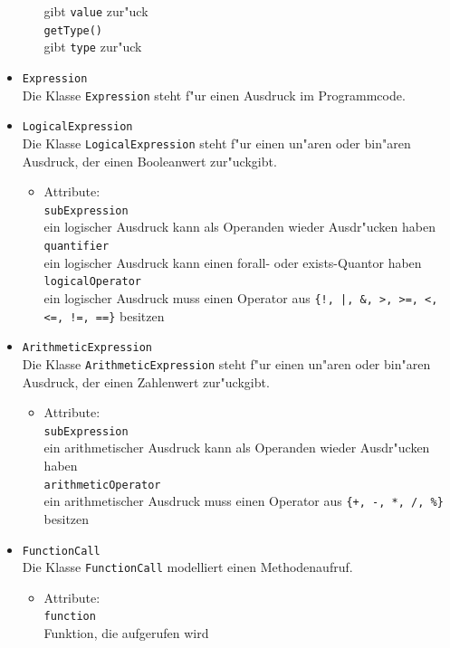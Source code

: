 \documentclass[10pt,a4paper,titlepage]{article}
\begin{document}
\begin{itemize}
\begin{itemize}
gibt \texttt{value} zur"uck \\
\texttt{getType()} \\
gibt \texttt{type} zur"uck
\end{itemize}
\item \texttt{Expression} \\
Die Klasse \texttt{Expression} steht f"ur einen Ausdruck im Programmcode. 
\item \texttt{LogicalExpression} \\
Die Klasse \texttt{LogicalExpression} steht f"ur einen un"aren oder bin"aren Ausdruck, der einen Booleanwert zur"uckgibt.
\begin{itemize}
\item Attribute: \\
\texttt{subExpression} \\
ein logischer Ausdruck kann als Operanden wieder Ausdr"ucken haben \\
\texttt{quantifier} \\
ein logischer Ausdruck kann einen forall- oder exists-Quantor haben \\
\texttt{logicalOperator} \\
ein logischer Ausdruck muss einen Operator aus \texttt{\{!, |, \&, >, >=, <, <=, !=, ==\}} besitzen 
\end{itemize}
\item \texttt{ArithmeticExpression} \\
Die Klasse \texttt{ArithmeticExpression} steht f"ur einen un"aren oder bin"aren Ausdruck, der einen Zahlenwert zur"uckgibt.
\begin{itemize}
\item Attribute: \\
\texttt{subExpression} \\
ein arithmetischer Ausdruck kann als Operanden wieder Ausdr"ucken haben \\
\texttt{arithmeticOperator} \\
ein arithmetischer Ausdruck muss einen Operator aus \texttt{\{+, -, *, /, \%\}} besitzen 
\end{itemize}
\item \texttt{FunctionCall} \\
Die Klasse \texttt{FunctionCall} modelliert einen Methodenaufruf. 
\begin{itemize}
\item Attribute: \\
\texttt{function} \\
Funktion, die aufgerufen wird \\

\end{itemize}
\end{itemize}
\end{document}
